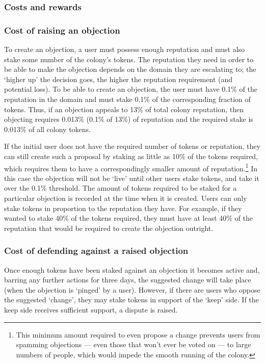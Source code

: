 \subsubsection{Costs and rewards}\label{sec:costs-of-disputes}

\subsubsection*{Cost of raising an objection}

To create an objection, a user must possess enough reputation and must also stake some number of the colony's tokens. The reputation they need in order to be able to make the objection depends on the domain they are escalating to; the `higher up' the decision goes, the higher the reputation requirement (and potential loss). To be able to create an objection, the user must have 0.1\% of the reputation in the domain and must stake 0.1\% of the corresponding fraction of tokens. Thus, if an objection appeals to 13\% of total colony reputation, then objecting requires 0.013\% (0.1\% of 13\%) of reputation and the required stake is 0.013\% of all colony tokens.

If the initial user does not have the required number of tokens or reputation, they can still create such a proposal by staking as little as 10\% of the tokens required, which requires them to have a correspondingly smaller amount of reputation.\footnote{This minimum amount required to even propose a change prevents users from spamming objections --- even those that won’t ever be voted on --- to large numbers of people, which would impede the smooth running of the colony.} In this case the objection will not be `live' until other users stake tokens, and take it over the 0.1\% threshold. The  amount of tokens required to be staked for a particular objection is recorded at the time when it is created. Users can only stake tokens in proportion to the reputation they have. For example, if they wanted to stake 40\% of the tokens required, they must have at least 40\% of the reputation that would be required to create the objection outright.

\subsubsection*{Cost of defending against a raised objection}

Once enough tokens have been staked against an objection it becomes active and, barring any further actions for three days, the suggested change will take place (when the objection is `pinged' by a user). However, if there are users who oppose the suggested `change', they may stake tokens in support of the `keep' side. If the keep side receives sufficient support, a dispute is raised.


